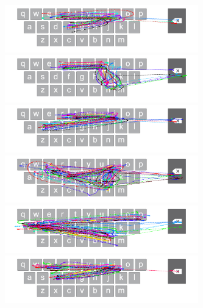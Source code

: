 \begin{figure}[t]
    \centering
	\begin{minipage}[t]{8in}
	\hspace{-20pt}
	\begin{minipage}[t]{3.1in}
		\includegraphics[width=3.3in]{Figures/fig_fir_paths}
	\end{minipage}
	\begin{minipage}[t]{3in}
		\includegraphics[width=3.3in]{Figures/fig_run_paths}
	\end{minipage}
	\end{minipage}
	
	\begin{minipage}[t]{8in}
	\hspace{-20pt}
	\begin{minipage}[t]{3.1in}
		\includegraphics[width=3.3in]{Figures/fig_sit_paths}
	\end{minipage}
	\begin{minipage}[t]{3in}
		\includegraphics[width=3.3in]{Figures/fig_fine_paths}
	\end{minipage}
	\end{minipage}
	
	\begin{minipage}[t]{8in}
	\hspace{-20pt}
	\begin{minipage}[t]{3.1in}
		\includegraphics[width=3.3in]{Figures/fig_pans_paths}
	\end{minipage}
	\begin{minipage}[t]{3in}
		\includegraphics[width=3.3in]{Figures/fig_dire_paths}
	\end{minipage}
	\end{minipage}
	

\end{figure}
